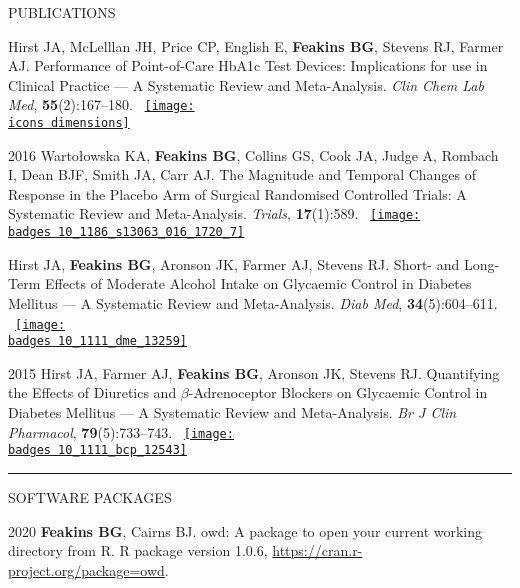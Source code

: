 \documentclass[10pt,a4paper]{article}
\def\badges{./badges/}
\def\icons{./icons/}
\begin{document}
\begin{cvlist}{PUBLICATIONS}
	\item[]
	Hirst JA, McLelllan JH, Price CP, English E, \textbf{Feakins BG}, Stevens RJ, Farmer AJ. Performance of Point-of-Care HbA1c Test Devices: Implications for use in Clinical Practice --- A Systematic Review and Meta-Analysis. \textit{Clin Chem Lab Med}, \textbf{55}(2):167--180. ~\href{https://badge.dimensions.ai/details/id/pub.1036082624}{\texttt{[image: \\icons dimensions]}}
	
	\item[2016]
	Warto\l{}owska KA, \textbf{Feakins BG}, Collins GS, Cook JA, Judge A, Rombach I, Dean BJF, Smith JA, Carr AJ. The Magnitude and Temporal Changes of Response in the Placebo Arm of Surgical Randomised Controlled Trials: A Systematic Review and Meta-Analysis. \textit{Trials}, \textbf{17}(1):589. ~\href{https://biomedcentral.altmetric.com/details/14679542}{\texttt{[image: \\badges 10\_1186\_s13063\_016\_1720\_7]}}
	
	\item[]
	Hirst JA, \textbf{Feakins BG}, Aronson JK, Farmer AJ, Stevens RJ. Short- and Long-Term Effects of Moderate Alcohol Intake on Glycaemic Control in Diabetes Mellitus --- A Systematic Review and Meta-Analysis. \textit{Diab Med}, \textbf{34}(5):604--611. ~\href{https://wiley.altmetric.com/details/11898077}{\texttt{[image: \\badges 10\_1111\_dme\_13259]}}
	
	\item[2015]
	Hirst JA, Farmer AJ, \textbf{Feakins BG}, Aronson JK, Stevens RJ. Quantifying the Effects of Diuretics and $\beta$-Adrenoceptor Blockers on Glycaemic Control in Diabetes Mellitus --- A Systematic Review and Meta-Analysis. \textit{Br J Clin Pharmacol}, \textbf{79}(5):733--743. ~\href{https://wiley.altmetric.com/details/2869563}{\texttt{[image: \\badges 10\_1111\_bcp\_12543]}}
	
\end{cvlist}


\noindent\rule{\textwidth}{0.4pt}
\begin{cvlist}{SOFTWARE PACKAGES}
	
	\item[2020]
	\textbf{Feakins BG}, Cairns BJ. owd: A package to open your current working directory from R. R package version 1.0.6, \url{https://cran.r-project.org/package=owd}.
	
\end{cvlist}
\end{document}

